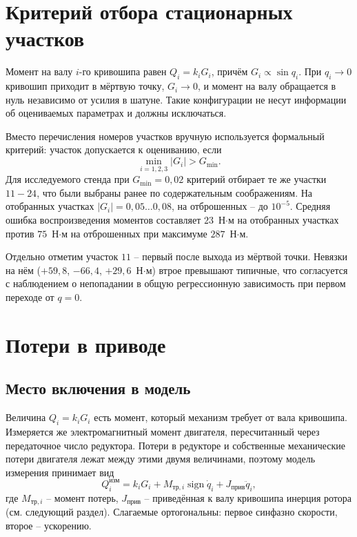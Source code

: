 \section{Критерий отбора стационарных участков}

Момент на валу $i$-го кривошипа равен $Q_i = k_iG_i$, причём $G_i \propto \sin{q_i}$. При $q_i \to 0$ кривошип приходит в мёртвую точку, $G_i \to 0$, и момент на валу обращается в нуль независимо от усилия в шатуне. Такие конфигурации не несут информации об оцениваемых параметрах и должны исключаться.

Вместо перечисления номеров участков вручную используется формальный критерий: участок допускается к оцениванию, если
\begin{equation}
\label{eq:SegmentCriterion}
\min_{i=1,2,3}\left|G_i\right| > G_{\min}.
\end{equation}
Для исследуемого стенда при $G_{\min} = 0{,}02$ критерий отбирает те же участки $11-24$, что были выбраны ранее по содержательным соображениям. На отобранных участках $\left|G_i\right| = 0{,}05\ldots0{,}08$, на отброшенных -- до $10^{-5}$. Средняя ошибка воспроизведения моментов составляет $23$~Н$\cdot$м на отобранных участках против $75$~Н$\cdot$м на отброшенных при максимуме $287$~Н$\cdot$м.

Отдельно отметим участок $11$ -- первый после выхода из мёртвой точки. Невязки на нём ($+59{,}8$, $-66{,}4$, $+29{,}6$~Н$\cdot$м) втрое превышают типичные, что согласуется с наблюдением о непопадании в общую регрессионную зависимость при первом переходе от $q = 0$.

\section{Потери в приводе}

\subsection{Место включения в модель}

Величина $Q_i = k_iG_i$ есть момент, который механизм требует от вала кривошипа. Измеряется же электромагнитный момент двигателя, пересчитанный через передаточное число редуктора. Потери в редукторе и собственные механические потери двигателя лежат между этими двумя величинами, поэтому модель измерения принимает вид
\begin{equation}
\label{eq:FrictionModel}
Q_i^{\text{изм}} = k_iG_i + M_{\text{тр},i}\operatorname{sign}\dot{q}_i + J_{\text{прив}}\ddot{q}_i ,
\end{equation}
где $M_{\text{тр},i}$ -- момент потерь, $J_{\text{прив}}$ -- приведённая к валу кривошипа инерция ротора (см. следующий раздел). Слагаемые ортогональны: первое синфазно скорости, второе -- ускорению.

